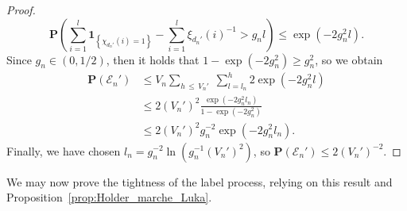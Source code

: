\documentclass[10pt]{amsart}
\theoremstyle{definition}\newtheorem{defi}[theo]{Definition}\newtheorem{rema}[theo]{Remark}\newtheorem{exam}[theo]{Example}\newtheorem{exem}[theo]{Example}\newtheorem{nota}[theo]{Notation}
\newcommand{\ensembles}[1]{\mathbf{#1}}
\renewcommand{\P}{\ensembles{P}}
\renewcommand{\Pr}[1]{\P\left(#1\right)}
\newcommand{\1}{\ensembles{1}}
\renewcommand{\le}{\leqslant}
\renewcommand{\ge}{\geqslant}
\newcommand{\clE}{\mathcal{E}}
\newcommand{\vertices}{V}
\providecommand{\?}{}
\begin{document}
\begin{proof}
\[
\Pr{\sum_{i=1}^l \1_{\left\{\chi_{d_n'}(i) = 1\right\}} - \sum_{i=1}^l \xi_{d_n'}(i)^{-1} > g_nl}
\le \exp\left(- 2 g_n^2 l\right).
\]
Since $g_n \in (0,1/2)$, then it holds that $1 - \exp(- 2 g_n^2) \ge g_n^2$, so we obtain
\begin{align*}
\Pr{\clE_n'} &\le \vertices_n \sum_{h\,\le\,\vertices_n'}\; \sum_{l = l_n}^h 2 \exp\left(- 2 g_n^2 l\right)
\\
&\le 2 \left(\vertices_n'\right)^2 \frac{\exp\left(- 2 g_n^2 l_n\right)}{1 - \exp\left(- 2 g_n^2\right)}
\\
&\le 2 \left(\vertices_n'\right)^2 g_n^{-2} \exp\left(- 2 g_n^2 l_n\right).
\end{align*}
Finally, we have chosen $l_n = g_n^{-2} \ln(g_n^{-1} (\vertices_n')^2)$, so $\P(\clE_n')
\le 2 (\vertices_n')^{- 2}$.
\end{proof}



We may now prove the tightness of the label process, relying on this result and Proposition~\ref{prop:Holder_marche_Luka}.
\end{document}
